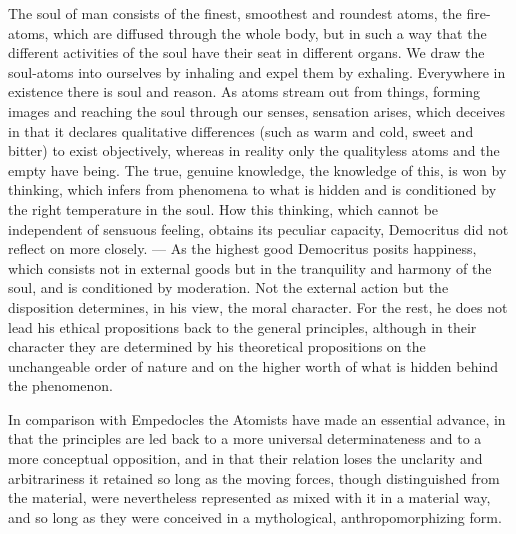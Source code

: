 The soul of man consists of the finest, smoothest and roundest atoms,
the fire-atoms, which are diffused through the whole body, but in such
a way that the different activities of the soul have their seat in
different organs. We draw the soul-atoms into ourselves by inhaling and
expel them by exhaling. Everywhere in existence there is soul and
reason. As atoms stream out from things, forming images and reaching
the soul through our senses, sensation arises, which deceives in that
it declares qualitative differences (such as warm and cold, sweet and
bitter) to exist objectively, whereas in reality only the qualityless
atoms and the empty have being. The true, genuine knowledge, the
knowledge of this, is won by thinking, which infers from phenomena to
what is hidden and is conditioned by the right temperature in the soul.
How this thinking, which cannot be independent of sensuous feeling,
obtains its peculiar capacity, Democritus did not reflect on more
closely. --- As the highest good Democritus posits happiness, which
consists not in external goods but in the tranquility and harmony of
the soul, and is conditioned by moderation. Not the external action but
the disposition determines, in his view, the moral character. For the
rest, he does not lead his ethical propositions back to the general
principles, although in their character they are determined by his
theoretical propositions on the unchangeable order of nature and on the
higher worth of what is hidden behind the phenomenon.

In comparison with Empedocles the Atomists have made an essential
advance, in that the principles are led back to a more universal
determinateness and to a more conceptual opposition, and in that their
relation loses the unclarity and arbitrariness it retained so long as
the moving forces, though distinguished from the material, were
nevertheless represented as mixed with it in a material way, and so
long as they were conceived in a mythological, anthropomorphizing form.

